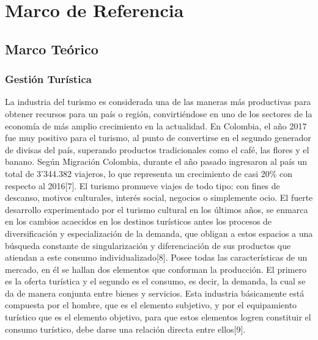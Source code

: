 \documentclass[12pt,letterpaper,openany]{book}
\begin{document}

\chapter{Marco de Referencia}\label{cap.marco_de_referencia}

\section{Marco Teórico}
\subsection{Gestión Turística}
La industria del turismo es considerada una de las maneras más productivas para obtener recursos para un país o región, convirtiéndose en uno de los sectores de la economía de más amplio crecimiento en la actualidad. En Colombia, el año 2017 fue muy positivo para el turismo, al punto de convertirse en el segundo generador de divisas del país, superando productos tradicionales como el café, las flores y el banano. Según Migración Colombia, durante el año pasado ingresaron al país un total de 3’344.382 viajeros, lo que representa un crecimiento de casi 20\% con respecto al 2016[7].
\vspace{5mm}\newline
El turismo promueve viajes de todo tipo: con fines de descanso, motivos culturales, interés social, negocios o simplemente ocio. El fuerte desarrollo experimentado por el turismo cultural en los últimos años, se enmarca en los cambios acaecidos en los destinos turísticos antes los procesos de diversificación y especialización de la demanda, que obligan a estos espacios a una búsqueda constante de singularización y diferenciación de sus productos que atiendan a este consumo individualizado[8].
\vspace{5mm}\newline
Posee todas las características de un mercado, en él se hallan dos elementos que conforman la producción. El primero es la oferta turística y el segundo es el consumo, es decir, la demanda, la cual se da de manera conjunta entre bienes y servicios. Esta industria básicamente está compuesta por el hombre, que es el elemento subjetivo, y por el equipamiento turístico que es el elemento objetivo, para que estos elementos logren constituir el consumo turístico, debe darse una relación directa entre ellos[9]. 
\end{document}
